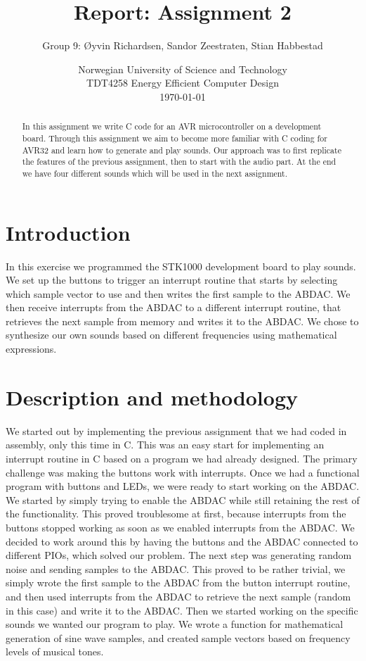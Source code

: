 \documentclass[a4paper,11pt]{article}
\title{\textbf{Report: Assignment 2}}
\author{Group 9: \O yvin Richardsen, Sandor Zeestraten, Stian Habbestad}
\date{{Norwegian University of Science and Technology \\
TDT4258 Energy Efficient Computer Design \\}
\today}
\begin{document}
\maketitle

\begin{abstract}
In this assignment we write C code for an AVR microcontroller on a development board. Through this assignment we aim to become more familiar with C coding for AVR32 and learn how to generate and play sounds. Our approach was to first replicate the features of the previous assignment, then to start with the audio part. At the end we have four different sounds which will be used in the next assignment.
\end{abstract}

\tableofcontents
\newpage

\section{Introduction}
In this exercise we programmed the STK1000 development board to play sounds. We set up the buttons to trigger an interrupt routine that starts by selecting which sample vector to use and then writes the first sample to the ABDAC. We then receive interrupts from the ABDAC to a different interrupt routine, that retrieves the next sample from memory and writes it to the ABDAC. We chose to synthesize our own sounds based on different frequencies using mathematical expressions. 

\section{Description and methodology}
We started out by implementing the previous assignment that we had coded in assembly, only this time in C. This was an easy start for implementing an interrupt routine in C based on a program we had already designed. The primary challenge was making the buttons work with interrupts. Once we had a functional program with buttons and LEDs, we were ready to start working on the ABDAC. We started by simply trying to enable the ABDAC while still retaining the rest of the functionality. This proved troublesome at first, because interrupts from the buttons stopped working as soon as we enabled interrupts from the ABDAC. We decided to work around this by having the buttons and the ABDAC connected to different PIOs, which solved our problem. The next step was generating random noise and sending samples to the ABDAC. This proved to be rather trivial, we simply wrote the first sample to the ABDAC from the button interrupt routine, and then used interrupts from the ABDAC to retrieve the next sample (random in this case) and write it to the ABDAC. Then we started working on the specific sounds we wanted our program to play. We wrote a function for mathematical generation of sine wave samples, and created sample vectors based on frequency levels of musical tones. 
\end{document}
